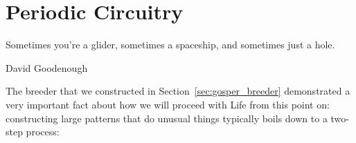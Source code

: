 
\renewcommand{\chapterfolder}{periodic_circuitry/}
\chapter{Periodic Circuitry}\label{chp:periodic_circuitry}


\vspace*{-0.4in}
\epigraph{Sometimes you're a glider, sometimes a spaceship, and sometimes just a hole.}{David Goodenough}
\vspace*{0.4in}


\noindent The breeder that we constructed in Section~\ref{sec:gosper_breeder} demonstrated a very important fact about how we will proceed with Life from this point on: constructing large patterns that do unusual things typically boils down to a two-step process:\smallskip

